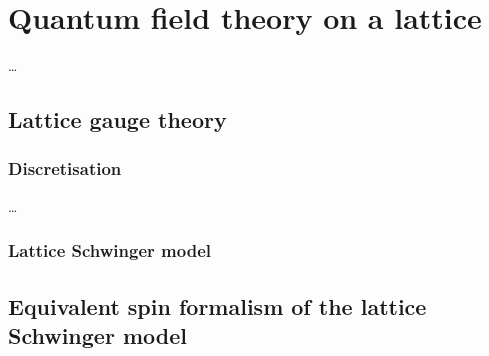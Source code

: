 \documentclass[../main.tex]{subfiles} %
\begin{document}
\chapter{Quantum field theory on a lattice} \label{chap:LatticeQFT}

\ldots



\section{Lattice gauge theory}

\subsection{Discretisation}

\ldots


\subsection{Lattice Schwinger model}

\lipsum



\section{Equivalent spin formalism of the lattice Schwinger model}

\lipsum\cite{standford_QFT}
\end{document}
